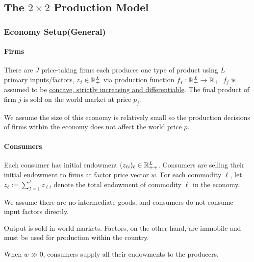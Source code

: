 \documentclass{report}
\begin{document}
		\subsection{The $2 \times 2$ Production Model}
			\subsubsection{Economy Setup(General)}
			\paragraph{Firms} There are $J$ price-taking firms each produces one type of product using $L$ primary inputs/factors, $z_j \in \mathbb{R}^L_+$ via production function $f_j: \mathbb{R}^L_+ \to \mathbb{R}_+$. $f_j$ is assumed to be \ul{concave, strictly increasing and differentiable}. The final product of firm $j$ is sold on the world market at price $p_j$.
			
			\begin{assumption}
				We assume the size of this economy is relatively small so the production decisions of firms within the economy does not affect the world price $p$.
			\end{assumption}			

			\paragraph{Consumers} Each consumer has initial endowment $(z_{\ell i})_\ell \in \mathbb{R}^L_{++}$. Consumers are selling their initial endowment to firms at factor price vector $w$. For each commodity $\ell$, let $\overline{z}_\ell := \sum_{I=1}^I z_{\ell i}$ denote the total endowment of commodity $\ell$ in the economy.
			
			\begin{assumption}
				We assume there are no intermediate goods, and consumers do not consume input factors directly.
			\end{assumption}
			
			\begin{remark}
				Output is sold in world markets. Factors, on the other hand, are immobile and must be used for production within the country.
			\end{remark}
			
			\begin{proposition}
				When $w \gg 0$, consumers supply all their endowments to the producers.
			\end{proposition}
			
\end{document}

